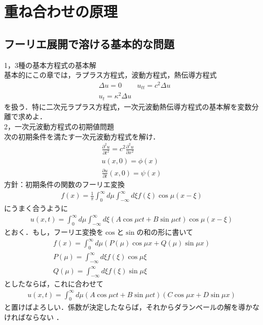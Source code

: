 \documentclass[a4j]{jarticle}
\begin{document}
\section{重ね合わせの原理}
\subsection{フーリエ展開で溶ける基本的な問題}
1，$3$種の基本方程式の基本解\\
基本的にこの章では，ラプラス方程式，波動方程式，熱伝導方程式
\begin{align*}
 &\Delta u=0 &u_{tt}=c^2\Delta u \\
 &u_{t}=\kappa^2\Delta u&
\end{align*}
を扱う．特に二次元ラプラス方程式，一次元波動熱伝導方程式の基本解を変数分離で求めよ．\\


2，一次元波動方程式の初期値問題\\
次の初期条件を満たす一次元波動方程式を解け．
\begin{align*}
 \frac{\partial^2u}{\partial t^2}=c^2 \frac{\partial^2u}{\partial x^2}\\
 u(x,0)=\phi(x)\\
 \frac{\partial u}{\partial t}(x,0)=\psi(x)
\end{align*}
方針：初期条件の関数のフーリエ変換
\begin{align*}
f(x)=\frac{1}{\pi}\int_{0}^{\infty}d\mu \int_{-\infty}^{\infty}d\xi f(\xi)\cos\mu (x-\xi) 
\end{align*}
にうまく合うように
\begin{align*}
 u(x,t)=\int_{0}^{\infty}d\mu \int_{-\infty}^{\infty}d\xi \left(A\cos \mu ct+B\sin \mu ct\right)\cos\mu (x-\xi) 
\end{align*}
とおく．もし，フーリエ変換を$\cos$と$\sin$の和の形に書いて
\begin{align*}
 f(x)=\int_{0}^{\infty}d\mu\left(P(\mu)\cos \mu x+Q(\mu)\sin \mu x\right)\\
 P(\mu)=\int_{-\infty}^{\infty}d\xi f(\xi)\cos \mu\xi \\
 Q(\mu)=\int_{-\infty}^{\infty}d\xi f(\xi)\sin \mu\xi
\end{align*}
としたならば，これに合わせて
\begin{align*}
 u(x,t)=\int_{0}^{\infty}d\mu \left(A\cos \mu ct+B\sin \mu ct\right)\left(C\cos \mu x+D\sin \mu x\right) 
\end{align*}
と置けばよろしい．係数が決定したならば，それからダランベールの解を導かなければならない
．
\end{document}
